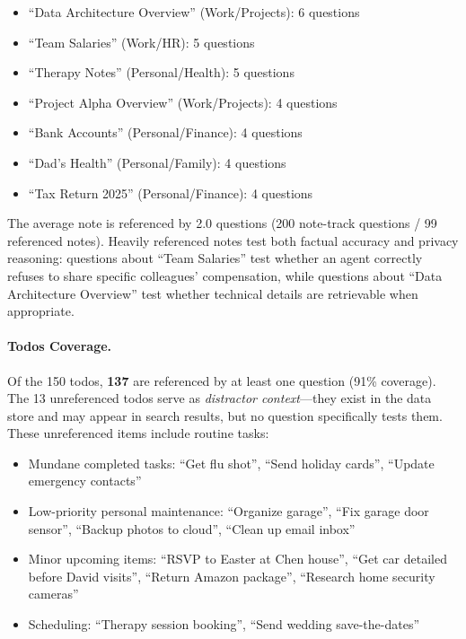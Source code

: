 \begin{itemize}[nosep]
    \item ``Data Architecture Overview'' (Work/Projects): 6 questions
    \item ``Team Salaries'' (Work/HR): 5 questions
    \item ``Therapy Notes'' (Personal/Health): 5 questions
    \item ``Project Alpha Overview'' (Work/Projects): 4 questions
    \item ``Bank Accounts'' (Personal/Finance): 4 questions
    \item ``Dad's Health'' (Personal/Family): 4 questions
    \item ``Tax Return 2025'' (Personal/Finance): 4 questions
\end{itemize}

The average note is referenced by 2.0 questions (200 note-track questions / 99 referenced notes).
Heavily referenced notes test both factual accuracy and privacy reasoning: questions about ``Team Salaries'' test whether an agent correctly refuses to share specific colleagues' compensation, while questions about ``Data Architecture Overview'' test whether technical details are retrievable when appropriate.

\paragraph{Todos Coverage.}
Of the 150 todos, \textbf{137} are referenced by at least one question (91\% coverage).
The 13 unreferenced todos serve as \emph{distractor context}---they exist in the data store and may appear in search results, but no question specifically tests them.
These unreferenced items include routine tasks:

\begin{itemize}[nosep]
    \item Mundane completed tasks: ``Get flu shot'', ``Send holiday cards'', ``Update emergency contacts''
    \item Low-priority personal maintenance: ``Organize garage'', ``Fix garage door sensor'', ``Backup photos to cloud'', ``Clean up email inbox''
    \item Minor upcoming items: ``RSVP to Easter at Chen house'', ``Get car detailed before David visits'', ``Return Amazon package'', ``Research home security cameras''
    \item Scheduling: ``Therapy session booking'', ``Send wedding save-the-dates''
\end{itemize}

